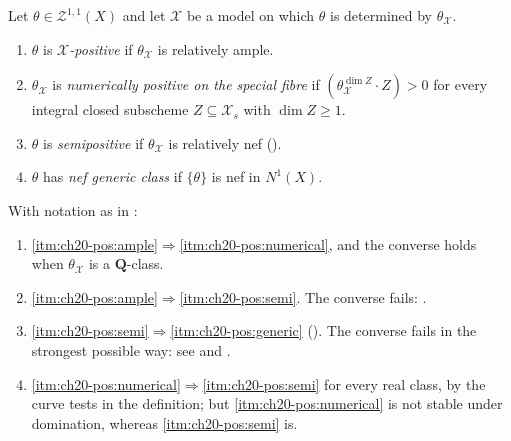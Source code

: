 \begin{definition}
\label{def:ch20-four-positivities}
Let $\theta\in\mathcal Z^{1,1}(X)$ and let $\mathcal X$ be a model on
which $\theta$ is determined by $\theta_{\mathcal X}$.
\begin{enumerate}
\item\label{itm:ch20-pos:ample} $\theta$ is \emph{$\mathcal X$-positive}
 if $\theta_{\mathcal X}$ is relatively ample.
\item\label{itm:ch20-pos:numerical} $\theta_{\mathcal X}$ is
 \emph{numerically positive on the special fibre} if
 $(\theta_{\mathcal X}^{\dim Z}\cdot Z)>0$ for every integral closed
 subscheme $Z\subseteq\mathcal X_s$ with $\dim Z\geq1$.
\item\label{itm:ch20-pos:semi} $\theta$ is \emph{semipositive} if
 $\theta_{\mathcal X}$ is relatively nef
 ().
\item\label{itm:ch20-pos:generic} $\theta$ has \emph{nef generic class}
 if $\{\theta\}$ is nef in $N^1(X)$.
\end{enumerate}
\end{definition}

\begin{theorem}
\label{thm:ch20-positivity-implications}
With notation as in :
\begin{enumerate}
\item\label{itm:ch20-impl:aton}
 \cref{itm:ch20-pos:ample}$\Rightarrow$\cref{itm:ch20-pos:numerical}, and
 the converse holds when $\theta_{\mathcal X}$ is a
 $\mathbf Q$-class.
\item\label{itm:ch20-impl:atos}
 \cref{itm:ch20-pos:ample}$\Rightarrow$\cref{itm:ch20-pos:semi}.  The
 converse fails: .
\item\label{itm:ch20-impl:stog}
 \cref{itm:ch20-pos:semi}$\Rightarrow$\cref{itm:ch20-pos:generic}
 \textup{()}.  The converse fails
 in the strongest possible way: see
  and
 .
\item\label{itm:ch20-impl:ntos}
 \cref{itm:ch20-pos:numerical}$\Rightarrow$\cref{itm:ch20-pos:semi}
 for every real class, by the curve tests in the definition;
 but \cref{itm:ch20-pos:numerical} is not stable
 under domination, whereas \cref{itm:ch20-pos:semi} is.
\end{enumerate}
\end{theorem}

